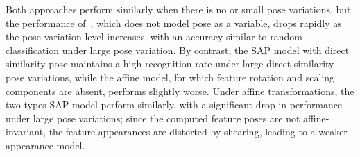 Both approaches perform similarly when there is no or small pose variations, but the performance of~\cite{Fergus2007}, which does not model pose as a variable, drops rapidly as the pose variation level increases, with an accuracy similar to random classification under large pose variation.  By contrast, the SAP model with direct similarity pose maintains a high recognition rate under large direct similarity pose variations, while the affine model, for which feature rotation and scaling components are absent, performs slightly worse. Under affine transformations, the two types SAP model perform similarly, with a significant drop in performance under large pose variations; since the computed feature poses are not affine-invariant, the feature appearances are distorted by shearing, leading to a weaker appearance model.

